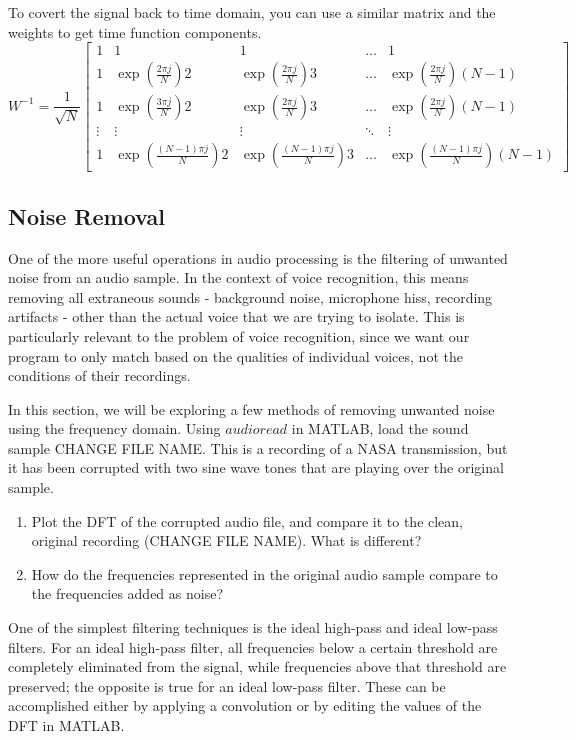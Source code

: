 \documentclass{tufte-handout}
\begin{document}
To covert the signal back to time domain, you can use a similar matrix and the weights to get time function components. 
\begin{equation}\label{eq:basis_fns}
    W^{-1}=\dfrac{1}{\sqrt{N}}
\begin{bmatrix}
    1 & 1 & 1 & \dots  & 1 \\
    1 & \exp(\frac{2 \pi j}{N})2 & \exp(\frac{2 \pi j}{N})3 & \dots  & \exp(\frac{2 \pi j}{N})(N-1) \\
    1 & \exp(\frac{3 \pi j}{N})2 & \exp(\frac{2 \pi j}{N})3 & \dots  & \exp(\frac{2 \pi j}{N}) (N-1) \\
    \vdots & \vdots & \vdots & \ddots & \vdots \\
    1 & \exp(\frac{(N-1) \pi j}{N})2 & \exp(\frac{(N-1) \pi j}{N})3 & \dots  & \exp(\frac{(N-1) \pi j}{N}) (N-1)
\end{bmatrix}
\end{equation}

\subsection{Noise Removal}
One of the more useful operations in audio processing is the filtering of unwanted noise from an audio sample. In the context of voice recognition, this means removing all extraneous sounds - background noise, microphone hiss, recording artifacts - other than the actual voice that we are trying to isolate. This is particularly relevant to the problem of voice recognition, since we want our program to only match based on the qualities of individual voices, not the conditions of their recordings.

In this section, we will be exploring a few methods of removing unwanted noise using the frequency domain. Using $audioread$ in MATLAB, load the sound sample CHANGE FILE NAME. This is a recording of a NASA transmission, but it has been corrupted with two sine wave tones that are playing over the original sample.

\begin{enumerate}
	\item Plot the DFT of the corrupted audio file, and compare it to the clean, original recording (CHANGE FILE NAME). What is different?
	\item How do the frequencies represented in the original audio sample compare to the frequencies added as noise?
\end{enumerate}

One of the simplest filtering techniques is the ideal high-pass and ideal low-pass filters. For an ideal high-pass filter, all frequencies below a certain threshold are completely eliminated from the signal, while frequencies above that threshold are preserved; the opposite is true for an ideal low-pass filter. These can be accomplished either by applying a convolution or by editing the values of the DFT in MATLAB.
\end{document}

